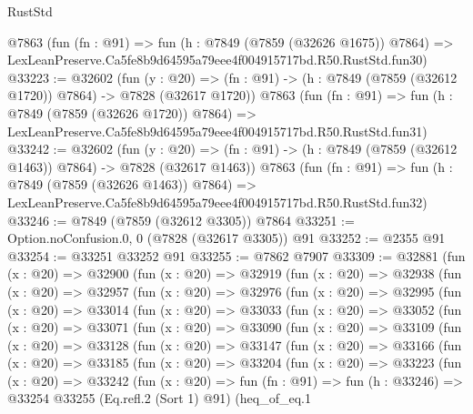 \begin{lexlean}{RustStd}
\begin{coremodule}
    @7863
    (fun (fn : @91) =>
    fun (h : @7849 (@7859 (@32626 @1675)) @7864) =>
    LexLeanPreserve.Ca5fe8b9d64595a79eee4f004915717bd.R50.RustStd.fun30)
@33223 := @32602
    (fun (y : @20) =>
    (fn : @91) -> (h : @7849 (@7859 (@32612 @1720)) @7864) -> @7828 (@32617 @1720))
    @7863
    (fun (fn : @91) =>
    fun (h : @7849 (@7859 (@32626 @1720)) @7864) =>
    LexLeanPreserve.Ca5fe8b9d64595a79eee4f004915717bd.R50.RustStd.fun31)
@33242 := @32602
    (fun (y : @20) =>
    (fn : @91) -> (h : @7849 (@7859 (@32612 @1463)) @7864) -> @7828 (@32617 @1463))
    @7863
    (fun (fn : @91) =>
    fun (h : @7849 (@7859 (@32626 @1463)) @7864) =>
    LexLeanPreserve.Ca5fe8b9d64595a79eee4f004915717bd.R50.RustStd.fun32)
@33246 := @7849 (@7859 (@32612 @3305)) @7864
@33251 := Option.noConfusion.{0, 0} (@7828 (@32617 @3305)) @91
@33252 := @2355 @91
@33254 := @33251 @33252 @91
@33255 := @7862 @7907
@33309 := @32881
    (fun (x : @20) =>
    @32900
      (fun (x : @20) =>
      @32919
        (fun (x : @20) =>
        @32938
          (fun (x : @20) =>
          @32957
            (fun (x : @20) =>
            @32976
              (fun (x : @20) =>
              @32995
                (fun (x : @20) =>
                @33014
                  (fun (x : @20) =>
                  @33033
                    (fun (x : @20) =>
                    @33052
                      (fun (x : @20) =>
                      @33071
                        (fun (x : @20) =>
                        @33090
                          (fun (x : @20) =>
                          @33109
                            (fun (x : @20) =>
                            @33128
                              (fun (x : @20) =>
                              @33147
                                (fun (x : @20) =>
                                @33166
                                  (fun (x : @20) =>
                                  @33185
                                    (fun (x : @20) =>
                                    @33204
                                      (fun (x : @20) =>
                                      @33223
                                        (fun (x : @20) =>
                                        @33242
                                          (fun (x : @20) =>
                                          fun (fn : @91) =>
                                          fun (h : @33246) =>
                                          @33254
                                            @33255
                                            (Eq.refl.{2} (Sort 1) @91)
                                            (heq_of_eq.{1}

\end{coremodule}
\end{lexlean}
